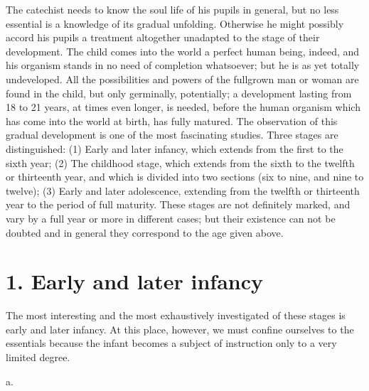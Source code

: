 The catechist needs to know the soul life of his pupils in general, but no less essential is a knowledge of its gradual unfolding. Otherwise he might possibly accord his pupils a treatment altogether unadapted to the stage of their development. The child comes into the world a perfect human being, indeed, and his organism stands in no need of completion whatsoever; but he is as yet totally undeveloped. All the possibilities and powers of the fullgrown man or woman are found in the child, but only germinally, potentially; a development lasting from 18 to 21 years, at times even longer, is needed, before the human organism which has come into the world at birth, has fully matured. The observation of this gradual development is one of the most fascinating studies. Three stages are distinguished: (1) Early and later infancy, which extends from the first to the sixth year; (2) The childhood stage, which extends from the sixth to the twelfth or thirteenth year, and which is divided into two sections (six to nine, and nine to twelve); (3) Early and later adolescence, extending from the twelfth or thirteenth year to the period of full maturity. These stages are not definitely marked, and vary by a full year or more in different cases; but their existence can not be doubted and in general they correspond to the age given above.

\section{1. Early and later infancy}

The most interesting and the most exhaustively investigated of these stages is early and later infancy. At this place, however, we must confine ourselves to the essentials because the infant becomes a subject of instruction only to a very limited degree.

a.

